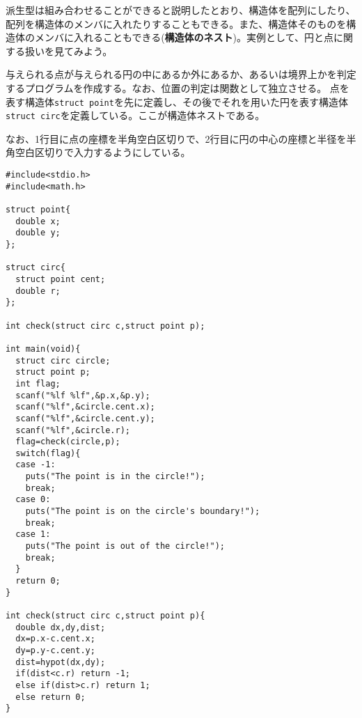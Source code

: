 派生型は組み合わせることができると説明したとおり、構造体を配列にしたり、配列を構造体のメンバに入れたりすることもできる。また、構造体そのものを構造体のメンバに入れることもできる(\textbf{構造体のネスト})。実例として、円と点に関する扱いを見てみよう。
\begin{boxnote}
\begin{multicols}{2}
与えられる点が与えられる円の中にあるか外にあるか、あるいは境界上かを判定するプログラムを作成する。なお、位置の判定は関数として独立させる。
点を表す構造体\verb|struct point|を先に定義し、その後でそれを用いた円を表す構造体\verb|struct circ|を定義している。ここが構造体ネストである。

なお、1行目に点の座標を半角空白区切りで、2行目に円の中心の座標と半径を半角空白区切りで入力するようにしている。
\begin{lstlisting}[caption=円と点の位置関係,label=program9_2]
#include<stdio.h>
#include<math.h>

struct point{
  double x;
  double y;
};

struct circ{
  struct point cent;
  double r;
};

int check(struct circ c,struct point p);

int main(void){
  struct circ circle;
  struct point p;
  int flag;
  scanf("%lf %lf",&p.x,&p.y);
  scanf("%lf",&circle.cent.x);
  scanf("%lf",&circle.cent.y);
  scanf("%lf",&circle.r);
  flag=check(circle,p);
  switch(flag){
  case -1:
    puts("The point is in the circle!");
    break;
  case 0:
    puts("The point is on the circle's boundary!");
    break;
  case 1:
    puts("The point is out of the circle!");
    break;
  }
  return 0; 
}

int check(struct circ c,struct point p){
  double dx,dy,dist;
  dx=p.x-c.cent.x;
  dy=p.y-c.cent.y;
  dist=hypot(dx,dy);
  if(dist<c.r) return -1;
  else if(dist>c.r) return 1;
  else return 0;
}
\end{lstlisting}
\end{multicols}
\end{boxnote}


